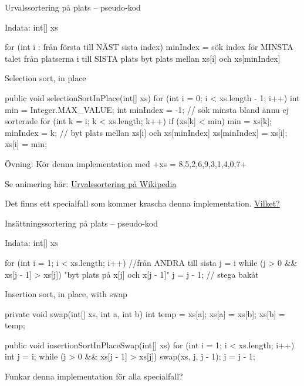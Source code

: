 \documentclass{lecturenotes}
\begin{document}
\begin{Slide}{Urvalssortering på plats -- pseudo-kod}
\begin{Code}
Indata: int[] xs

for (int i : från första till NÄST sista index) { 
     minIndex = sök index för MINSTA talet från platserna i till SISTA plats
     byt plats mellan xs[i] och xs[minIndex]       
}
\end{Code}
\end{Slide}

\begin{Slide}{Selection sort, in place}
\begin{Code}
public void selectionSortInPlace(int[] xs) {
    for (int i = 0; i < xs.length - 1; i++) { 
        int min = Integer.MAX_VALUE;
        int minIndex = -1;
        // sök minsta bland ännu ej sorterade
        for (int k = i; k < xs.length; k++) {  
            if (xs[k] < min) {
                min = xs[k];
                minIndex = k;
            }
        }
        // byt plats mellan xs[i] och xs[minIndex] 
        xs[minIndex] = xs[i]; 
        xs[i] = min;          
    }
}
\end{Code}
\footnotesize
\pause
Övning: Kör denna implementation med \code+xs = {8,5,2,6,9,3,1,4,0,7}+

\pause
Se animering här: \href{https://sv.wikipedia.org/wiki/Urvalssortering}{Urvalssortering på Wikipedia}

\pause Det finns ett specialfall som kommer krascha denna implementation. \href{https://github.com/bjornregnell/lth-eda016-2015/blob/master/lectures/examples/eclipse-ws/lecture-examples/src/week12/sorting/SortUtilTest.java#L30}{Vilket?}
\end{Slide}

\begin{Slide}{Insättningssortering på plats -- pseudo-kod}
\begin{Code}
Indata: int[] xs

for (int i = 1; i < xs.length; i++) {  //från ANDRA till sista
     j = i
     while (j > 0 && xs[j - 1] > xs[j]) {
        "byt plats på x[j] och x[j - 1]"
         j = j - 1;  // stega bakåt
     }
}
\end{Code}
\end{Slide}

\begin{Slide}{Insertion sort, in place, with swap}
\begin{Code}
private void swap(int[] xs, int a, int b) {
    int temp = xs[a];
    xs[a] = xs[b];
    xs[b] = temp;
}

public void insertionSortInPlaceSwap(int[] xs) {
    for (int i = 1; i < xs.length; i++) {
        int j = i;
        while (j > 0 && xs[j - 1] > xs[j]) {
            swap(xs, j, j - 1);
            j = j - 1;
        }
    }
}
\end{Code}
Funkar denna implementation för alla specialfall?
\end{Slide}
\end{document}
